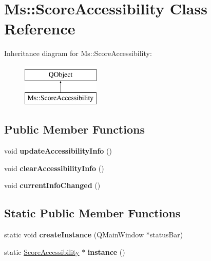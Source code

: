 \hypertarget{class_ms_1_1_score_accessibility}{}\section{Ms\+:\+:Score\+Accessibility Class Reference}
\label{class_ms_1_1_score_accessibility}
Inheritance diagram for Ms\+:\+:Score\+Accessibility\+:\begin{figure}[H]
\begin{center}
\leavevmode
\includegraphics[height=2.000000cm]{class_ms_1_1_score_accessibility}
\end{center}
\end{figure}
\subsection*{Public Member Functions}
\begin{DoxyCompactItemize}
\item 
\mbox{\label{class_ms_1_1_score_accessibility_a80943f6273785944f6162e65c69aef4c}} 
void {\bfseries update\+Accessibility\+Info} ()
\item 
\mbox{\label{class_ms_1_1_score_accessibility_ab599dd1d2ea8a07138e0d34e46abe4bb}} 
void {\bfseries clear\+Accessibility\+Info} ()
\item 
\mbox{\label{class_ms_1_1_score_accessibility_a15b288b0ce7a35c60433abd0ae98364b}} 
void {\bfseries current\+Info\+Changed} ()
\end{DoxyCompactItemize}
\subsection*{Static Public Member Functions}
\begin{DoxyCompactItemize}
\item 
\mbox{\label{class_ms_1_1_score_accessibility_abe74fcebd5540f597e037a4cd5a01069}} 
static void {\bfseries create\+Instance} (Q\+Main\+Window $\ast$status\+Bar)
\item 
\mbox{\label{class_ms_1_1_score_accessibility_ae738485b5f6979cd0f41ca231a6bea12}} 
static \hyperlink{class_ms_1_1_score_accessibility}{Score\+Accessibility} $\ast$ {\bfseries instance} ()
\end{DoxyCompactItemize}


